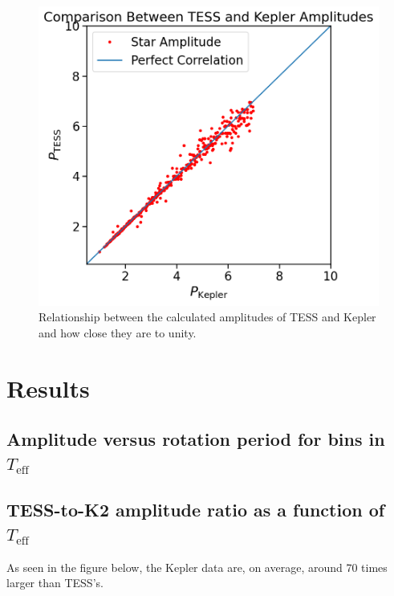\documentclass[modern]{aastex631}
\begin{document}
  \begin{figure}[!htb]
    \centering
    \includegraphics[scale=0.5]{Comparison Between TESS and Kepler Amplitudes.png}
    \caption{Relationship between the calculated amplitudes of TESS and Kepler and how close they are to unity.}
  \end{figure}
  \FloatBarrier


\section{Results}

\subsection{Amplitude versus rotation period for bins in $T_{\mathrm{eff}}$}

\subsection{TESS-to-K2 amplitude ratio as a function of $T_{\mathrm{eff}}$}

 As seen in the figure below, the Kepler data are, on average, around 70 times larger than TESS's.
\end{document}
